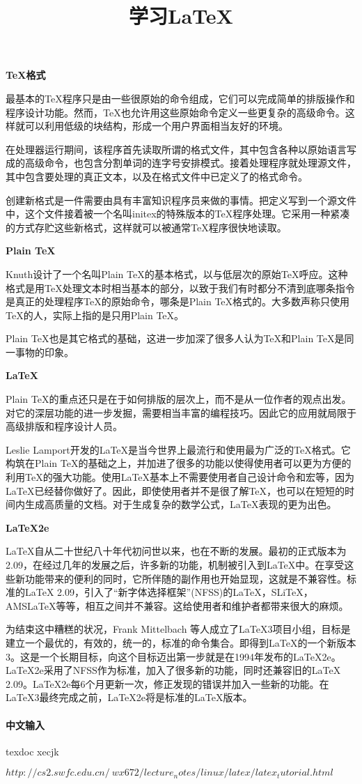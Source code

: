\documentclass{article}
\begin{document}
\title{学习LaTeX}

\textbf{TeX格式}

最基本的TeX程序只是由一些很原始的命令组成，它们可以完成简单的排版操作和程序设计功能。然而，TeX也允许用这些原始命令定义一些更复杂的高级命令。这样就可以利用低级的块结构，形成一个用户界面相当友好的环境。

在处理器运行期间，该程序首先读取所谓的格式文件，其中包含各种以原始语言写成的高级命令，也包含分割单词的连字号安排模式。接着处理程序就处理源文件，其中包含要处理的真正文本，以及在格式文件中已定义了的格式命令。

创建新格式是一件需要由具有丰富知识程序员来做的事情。把定义写到一个源文件中，这个文件接着被一个名叫initex的特殊版本的TeX程序处理。它采用一种紧凑的方式存贮这些新格式，这样就可以被通常TeX程序很快地读取。

\textbf{Plain TeX}

Knuth设计了一个名叫Plain TeX的基本格式，以与低层次的原始TeX呼应。这种格式是用TeX处理文本时相当基本的部分，以致于我们有时都分不清到底哪条指令是真正的处理程序TeX的原始命令，哪条是Plain TeX格式的。大多数声称只使用TeX的人，实际上指的是只用Plain TeX。

Plain TeX也是其它格式的基础，这进一步加深了很多人认为TeX和Plain TeX是同一事物的印象。

\textbf{LaTeX}

Plain TeX的重点还只是在于如何排版的层次上，而不是从一位作者的观点出发。对它的深层功能的进一步发掘，需要相当丰富的编程技巧。因此它的应用就局限于高级排版和程序设计人员。

Leslie Lamport开发的LaTeX是当今世界上最流行和使用最为广泛的TeX格式。它构筑在Plain TeX的基础之上，并加进了很多的功能以使得使用者可以更为方便的利用TeX的强大功能。使用LaTeX基本上不需要使用者自己设计命令和宏等，因为LaTeX已经替你做好了。因此，即使使用者并不是很了解TeX，也可以在短短的时间内生成高质量的文档。对于生成复杂的数学公式，LaTeX表现的更为出色。

\textbf{LaTeX2e}

LaTeX自从二十世纪八十年代初问世以来，也在不断的发展。最初的正式版本为2.09，在经过几年的发展之后，许多新的功能，机制被引入到LaTeX中。在享受这些新功能带来的便利的同时，它所伴随的副作用也开始显现，这就是不兼容性。标准的LaTeX 2.09，引入了“新字体选择框架”(NFSS)的LaTeX，SLiTeX，AMSLaTeX等等，相互之间并不兼容。这给使用者和维护者都带来很大的麻烦。

为结束这中糟糕的状况，Frank Mittelbach 等人成立了LaTeX3项目小组，目标是建立一个最优的，有效的，统一的，标准的命令集合。即得到LaTeX的一个新版本3。这是一个长期目标，向这个目标迈出第一步就是在1994年发布的LaTeX2e。LaTeX2e采用了NFSS作为标准，加入了很多新的功能，同时还兼容旧的LaTeX 2.09。LaTeX2e每6个月更新一次，修正发现的错误并加入一些新的功能。在LaTeX3最终完成之前，LaTeX2e将是标准的LaTeX版本。

\paragraph{中文输入}

texdoc xecjk


\begin{thebibliography}{99}
 $http://cs2.swfc.edu.cn/~wx672/lecture_notes/linux/latex/latex_tutorial.html $
\end{thebibliography}
\end{document}
